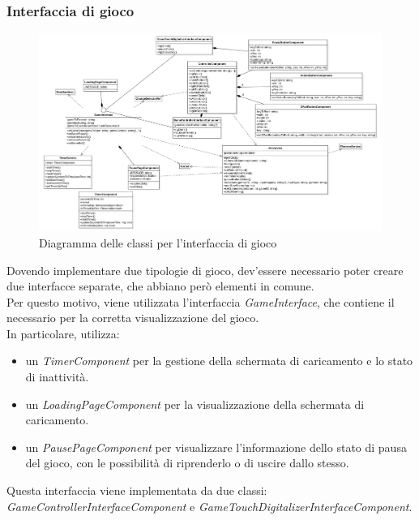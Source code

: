 \subsubsection{Interfaccia di gioco}
\begin{figure}[h]
    \centering
    \includegraphics[width=340pt]{images/prog/GameInterface.png}
    \caption{Diagramma delle classi per l'interfaccia di gioco}
    \label{fig:gameinterface}
\end{figure}
Dovendo implementare due tipologie di gioco, dev'essere necessario poter creare due interfacce separate, che abbiano però elementi in comune.\\
Per questo motivo, viene utilizzata l'interfaccia \emph{GameInterface}, che contiene il necessario per la corretta visualizzazione del gioco.\\
In particolare, utilizza:
\begin{itemize}
    \item un \emph{TimerComponent} per la gestione della schermata di caricamento e lo stato di inattività.
    \item un \emph{LoadingPageComponent} per la visualizzazione della schermata di caricamento.
    \item un \emph{PausePageComponent} per visualizzare l'informazione dello stato di pausa del gioco, con le possibilità di riprenderlo o di uscire dallo stesso.
\end{itemize}
Questa interfaccia viene implementata da due classi: \emph{GameControllerInterfaceComponent} e \emph{GameTouchDigitalizerInterfaceComponent}.
\newpage
